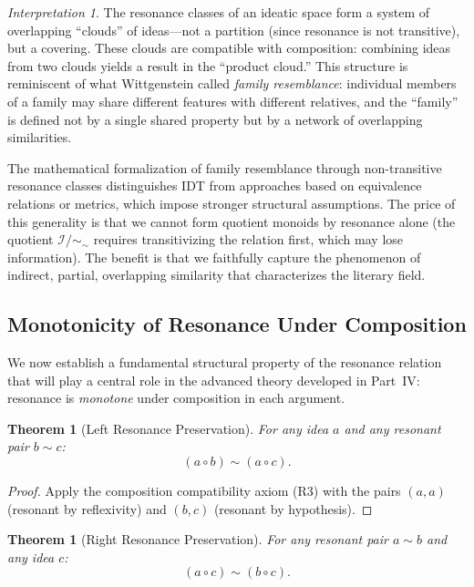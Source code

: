 \documentclass[11pt,openany]{book}
\theoremstyle{definition}
\theoremstyle{plain}
\newtheorem{theorem}[axiom]{Theorem}
\theoremstyle{remark}
\newtheorem{interpretation}[axiom]{Interpretation}
\newcommand{\IS}{\mathcal{I}}               %
\newcommand{\compose}{\circ}                 %
\newcommand{\res}{\sim}                      %
\begin{document}
\begin{interpretation}
The resonance classes of an ideatic space form a system of overlapping ``clouds'' of ideas---not a partition (since resonance is not transitive), but a covering. These clouds are compatible with composition: combining ideas from two clouds yields a result in the ``product cloud.'' This structure is reminiscent of what Wittgenstein called \emph{family resemblance}: individual members of a family may share different features with different relatives, and the ``family'' is defined not by a single shared property but by a network of overlapping similarities.

The mathematical formalization of family resemblance through non-transitive resonance classes distinguishes IDT from approaches based on equivalence relations or metrics, which impose stronger structural assumptions. The price of this generality is that we cannot form quotient monoids by resonance alone (the quotient $\IS / {\sim_{\res}}$ requires transitivizing the relation first, which may lose information). The benefit is that we faithfully capture the phenomenon of indirect, partial, overlapping similarity that characterizes the literary field.
\end{interpretation}

\subsection{Monotonicity of Resonance Under Composition}

We now establish a fundamental structural property of the resonance relation that will play a central role in the advanced theory developed in Part~IV: resonance is \emph{monotone} under composition in each argument.

\begin{theorem}[Left Resonance Preservation]
\label{thm:left-res-ch4}
For any idea $a$ and any resonant pair $b \res c$:
\[
(a \compose b) \res (a \compose c).
\]
\end{theorem}

\begin{proof}
Apply the composition compatibility axiom (R3) with the pairs $(a, a)$ (resonant by reflexivity) and $(b, c)$ (resonant by hypothesis).
\end{proof}

\begin{theorem}[Right Resonance Preservation]
\label{thm:right-res-ch4}
For any resonant pair $a \res b$ and any idea $c$:
\[
(a \compose c) \res (b \compose c).
\]
\end{theorem}
\end{document}
